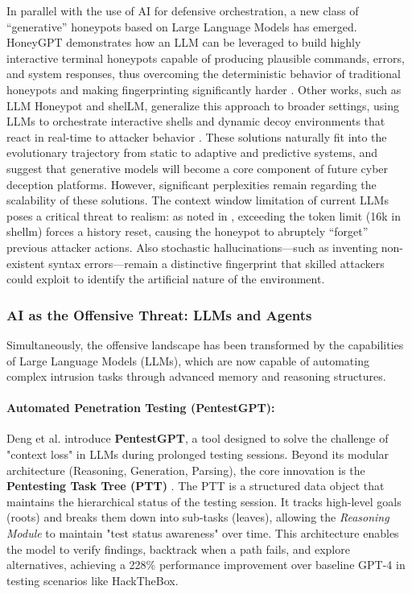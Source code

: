 In parallel with the use of AI for defensive orchestration, a new class of
``generative'' honeypots based on Large Language Models has emerged. HoneyGPT
demonstrates how an LLM can be leveraged to build highly interactive terminal
honeypots capable of producing plausible commands, errors, and system responses,
thus overcoming the deterministic behavior of traditional honeypots and making
fingerprinting significantly harder \cite{honeygpt2025}. Other works, such as
LLM Honeypot and shelLM, generalize this approach to broader settings, using
LLMs to orchestrate interactive shells and dynamic decoy environments that
react in real-time to attacker behavior \cite{llmhoneypot2024,shellm2024}.
These solutions naturally fit into the evolutionary trajectory from static to
adaptive and predictive systems, and suggest that generative models will become
a core component of future cyber deception platforms.
However, significant perplexities remain regarding the scalability of these solutions.
The context window limitation of current LLMs poses a critical threat to
realism: as noted in \cite{shellm2024}, exceeding the token limit (16k in shellm) forces
a history reset, causing the honeypot to abruptely ``forget'' previous attacker actions.
Also stochastic hallucinations---such as inventing
non-existent syntax errors---remain a distinctive fingerprint that skilled attackers
could exploit to identify the artificial nature of the environment.

\subsubsection{AI as the Offensive Threat: LLMs and Agents}

Simultaneously, the offensive landscape has been transformed by the capabilities of Large Language Models (LLMs),
which are now capable of automating complex intrusion tasks through advanced memory and reasoning structures.

\paragraph{Automated Penetration Testing (PentestGPT):}
Deng et al. introduce \textbf{PentestGPT}, a tool designed to solve the challenge of "context loss" in LLMs
during prolonged testing sessions. Beyond its modular architecture (Reasoning, Generation, Parsing), the core
innovation is the \textbf{Pentesting Task Tree (PTT)} \cite{deng2023pentestgpt}.
The PTT is a structured data object that maintains the hierarchical status of the testing session. It tracks
high-level goals (roots) and breaks them down into sub-tasks (leaves), allowing the \textit{Reasoning Module}
to maintain "test status awareness" over time. This architecture enables the model to verify findings, backtrack
when a path fails, and explore alternatives, achieving a 228\% performance improvement over baseline GPT-4 in
testing scenarios like HackTheBox.

